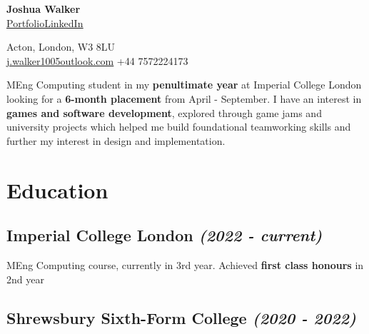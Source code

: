 \documentclass{article}
\makeatletter
\newcommand{\contact}[1]{\normalsize{#1}}
\newcommand{\contactdiv} {\hspace*{0.8em}}
\newcommand{\email}[2]{\href{mailto:#1@#2}{\underline{#1{\small\fontfamily{phv}\selectfont@}#2}}}
\newcommand{\linkedin}{\href{https://www.linkedin.com/in/joshua-walker-080714238/}{\underline{LinkedIn}}}
\newcommand{\portfolio}{\href{https://josh-ja-walker.github.io/portfolio/}{\underline{Portfolio}}}
\newcommand{\dates}[1]{\hfill\textit{(#1)}}
\newcommand{\tab}{\hspace{1em}}
\makeatother
\begin{document}
\begin{multicols}{2}

    \begin{flushleft}
        {\LARGE\textbf{Joshua Walker}}\\
        \vspace{0.2em}
        \portfolio\contactdiv\linkedin
    \end{flushleft}
    
    \columnbreak
    
    \begin{flushright}
        \contact{Acton, London, W3 8LU}\\
        \vspace{0.2em}
        \contact{\email{j.walker1005}{outlook.com}}
        \contactdiv
        \contact{+44 7572224173}
    \end{flushright}
    
\end{multicols}

\vspace{0.15em}

\begin{minipage}{\dimexpr\textwidth - 1em}
    MEng Computing student in my \textbf{penultimate year} at Imperial College London looking for a 
    \textbf{6-month placement} from April - September. I have an interest in \textbf{games and software development}, 
    explored through game jams and university projects which helped me build foundational teamworking skills 
    and further my interest in design and implementation.
\end{minipage}

\vspace{0.15em}

\section*{Education}

\subsection*{\textbf{Imperial College London} \dates{2022 - current}}

{\tab}MEng Computing course, currently in 3rd year. Achieved \textbf{first class honours} in 2nd year


\subsection*{\textbf{Shrewsbury Sixth-Form College} \dates{2020 - 2022}}
\end{document}
